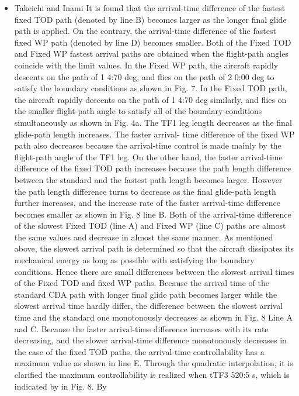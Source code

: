 \documentclass{aer1315-pretty}
\begin{document}
\begin{itemize}
\item Takeichi and Inami \cite{Takeichi:2010}
   It is found that the arrival-time difference of the fastest ﬁxed TOD
path (denoted by line B) becomes larger as the longer ﬁnal glide path
is applied. On the contrary, the arrival-time difference of the fastest
ﬁxed WP path (denoted by line D) becomes smaller. Both of the
Fixed TOD and Fixed WP fastest arrival paths are obtained when the
ﬂight-path angles coincide with the limit values. In the Fixed WP
path, the aircraft rapidly descents on the path of 1           4:70 deg,
and ﬂies on the path of 2 0:00 deg to satisfy the boundary
conditions as shown in Fig. 7. In the Fixed TOD path, the aircraft
rapidly descents on the path of 1          4:70 deg similarly, and ﬂies
on the smaller ﬂight-path angle to satisfy all of the boundary
conditions simultaneously as shown in Fig. 4a. The TF1 leg length
decreases as the ﬁnal glide-path length increases. The faster arrival-
time difference of the ﬁxed WP path also decreases because
the arrival-time control is made mainly by the ﬂight-path angle of the
TF1 leg. On the other hand, the faster arrival-time difference of the
ﬁxed TOD path increases because the path length difference between
the standard and the fastest path length becomes larger. However the
path length difference turns to decrease as the ﬁnal glide-path length
further increases, and the increase rate of the faster arrival-time
difference becomes smaller as shown in Fig. 8 line B.
   Both of the arrival-time difference of the slowest Fixed TOD (line
A) and Fixed WP (line C) paths are almost the same values and
decrease in almost the same manner. As mentioned above, the
slowest arrival path is determined so that the aircraft dissipates its
mechanical energy as long as possible with satisfying the boundary
conditions. Hence there are small differences between the slowest
arrival times of the Fixed TOD and ﬁxed WP paths. Because the
arrival time of the standard CDA path with longer ﬁnal glide path
becomes larger while the slowest arrival time hardly differ, the
difference between the slowest arrival time and the standard one
monotonously decreases as shown in Fig. 8 Line A and C.
   Because the faster arrival-time difference increases with its rate
decreasing, and the slower arrival-time difference monotonously
decreases in the case of the ﬁxed TOD paths, the arrival-time
controllability has a maximum value as shown in line E. Through the
quadratic interpolation, it is clariﬁed the maximum controllability is
realized when tTF3 520:5 s, which is indicated by in Fig. 8. By

\end{itemize}
\end{document}
